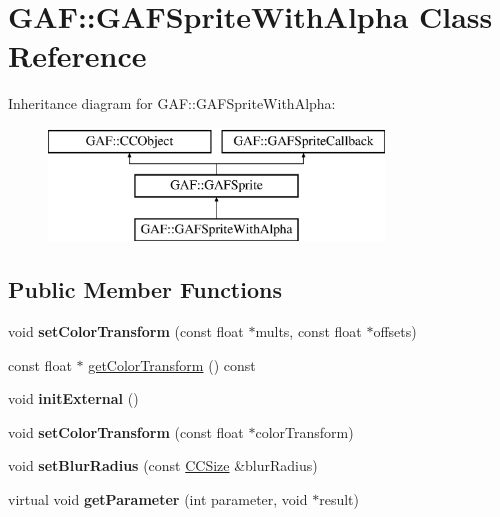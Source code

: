 \hypertarget{class_g_a_f_1_1_g_a_f_sprite_with_alpha}{\section{G\-A\-F\-:\-:G\-A\-F\-Sprite\-With\-Alpha Class Reference}
\label{class_g_a_f_1_1_g_a_f_sprite_with_alpha}
}
Inheritance diagram for G\-A\-F\-:\-:G\-A\-F\-Sprite\-With\-Alpha\-:\begin{figure}[H]
\begin{center}
\leavevmode
\includegraphics[height=3.000000cm]{class_g_a_f_1_1_g_a_f_sprite_with_alpha}
\end{center}
\end{figure}
\subsection*{Public Member Functions}
\begin{DoxyCompactItemize}
\item 
\hypertarget{class_g_a_f_1_1_g_a_f_sprite_with_alpha_a0ff0709d93c1b67f9065e47c87397df7}{void {\bfseries set\-Color\-Transform} (const float $\ast$mults, const float $\ast$offsets)}\label{class_g_a_f_1_1_g_a_f_sprite_with_alpha_a0ff0709d93c1b67f9065e47c87397df7}

\item 
const float $\ast$ \hyperlink{class_g_a_f_1_1_g_a_f_sprite_with_alpha_a0b03aca5ef3f81a3672ab5ccd6445d80}{get\-Color\-Transform} () const 
\item 
\hypertarget{class_g_a_f_1_1_g_a_f_sprite_with_alpha_ac56b5e2afe33626a142e8cf9f3c4abbe}{void {\bfseries init\-External} ()}\label{class_g_a_f_1_1_g_a_f_sprite_with_alpha_ac56b5e2afe33626a142e8cf9f3c4abbe}

\item 
\hypertarget{class_g_a_f_1_1_g_a_f_sprite_with_alpha_a3fbb262c8b3c4014ffae643f12cb6569}{void {\bfseries set\-Color\-Transform} (const float $\ast$color\-Transform)}\label{class_g_a_f_1_1_g_a_f_sprite_with_alpha_a3fbb262c8b3c4014ffae643f12cb6569}

\item 
\hypertarget{class_g_a_f_1_1_g_a_f_sprite_with_alpha_a658502a8de039fe45ad50ae7da1ac8cc}{void {\bfseries set\-Blur\-Radius} (const \hyperlink{class_g_a_f_1_1_c_c_size}{C\-C\-Size} \&blur\-Radius)}\label{class_g_a_f_1_1_g_a_f_sprite_with_alpha_a658502a8de039fe45ad50ae7da1ac8cc}

\item 
\hypertarget{class_g_a_f_1_1_g_a_f_sprite_with_alpha_a438088428165e03f7392e582b69fee00}{virtual void {\bfseries get\-Parameter} (int parameter, void $\ast$result)}\label{class_g_a_f_1_1_g_a_f_sprite_with_alpha_a438088428165e03f7392e582b69fee00}

\end{DoxyCompactItemize}
